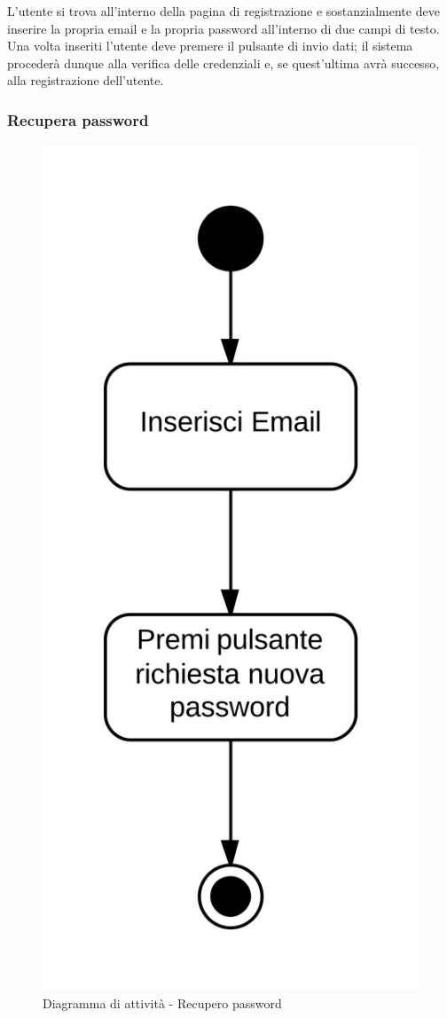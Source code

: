 L'utente si trova all'interno della pagina di registrazione e sostanzialmente deve inserire la propria email e la propria password all'interno di due campi di testo. Una volta inseriti l'utente deve premere il pulsante di invio dati; il sistema  procederà dunque alla verifica delle credenziali e, se quest'ultima avrà successo, alla registrazione dell'utente.

\subsubsection{Recupera password}

\begin{figure}[H]
\centering
\includegraphics[scale=0.05]{uml/attivita/MaaP - Recupera password.png}
\caption{Diagramma di attività - Recupero password}
\end{figure}

